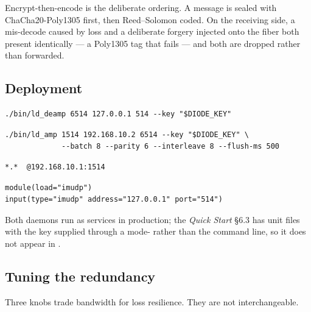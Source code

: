 \documentclass[11pt,a4paper]{article}
\begin{document}
Encrypt-then-encode is the deliberate ordering. A message is sealed with
ChaCha20-Poly1305 first, then Reed--Solomon coded. On the receiving side, a
mis-decode caused by loss and a deliberate forgery injected onto the fiber
both present identically --- a Poly1305 tag that fails --- and both are
dropped rather than forwarded.

\subsection{Deployment}

\begin{lstlisting}[style=shell,caption={DESTINATION side --- start this first}]
./bin/ld_deamp 6514 127.0.0.1 514 --key "$DIODE_KEY"
\end{lstlisting}

\begin{lstlisting}[style=shell,caption={SOURCE side}]
./bin/ld_amp 1514 192.168.10.2 6514 --key "$DIODE_KEY" \
             --batch 8 --parity 6 --interleave 8 --flush-ms 500
\end{lstlisting}

\begin{lstlisting}[style=conf,caption={Log producers --- \file{/etc/rsyslog.conf}}]
*.*  @192.168.10.1:1514
\end{lstlisting}

\begin{lstlisting}[style=conf,caption={DESTINATION host --- \file{/etc/rsyslog.d/10-diode-in.conf}}]
module(load="imudp")
input(type="imudp" address="127.0.0.1" port="514")
\end{lstlisting}

Both daemons run as  services in production; the \emph{Quick
Start} \S6.3 has unit files with the key supplied through a
mode-  rather than the command line, so it does
not appear in \cmd{ps}.

\subsection{Tuning the redundancy}
\label{sec:tuning}

Three knobs trade bandwidth for loss resilience. They are not
interchangeable.
\end{document}
